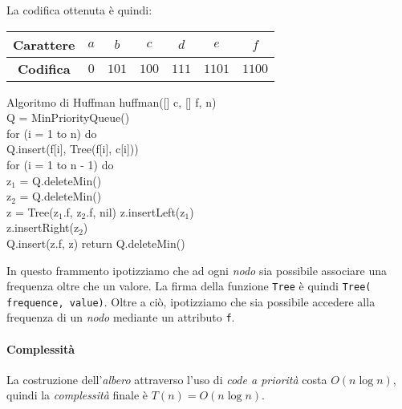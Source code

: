 \noindent
La codifica ottenuta è quindi:
\begin{table}[h!]
    \centering
    \renewcommand{\arraystretch}{1.2}
    \begin{tabular}{|c|c|c|c|c|c|c|}
        \hline
        \textbf{Carattere} & $a$ & $b$ & $c$ & $d$ & $e$ & $f$\\
        \hline
        \textbf{Codifica} & $0$ & $101$ & $100$ & $111$ & $1101$ &  $1100$\\
        \hline
    \end{tabular}
\end{table}

\newpage
\begin{minicode}{Algoritmo di Huffman}
\ind{} huffman([] c, [] f,  n)\\
     Q = MinPriorityQueue()\\
    \indf for (i = 1 to n) do\\
        Q.insert(f[i], Tree(f[i], c[i]))\\
    \indf for (i = 1 to n - 1) do\\
        z$_1$ = Q.deleteMin()\\
        z$_2$ = Q.deleteMin()\\
        z = Tree(z$_1$.f, z$_2$.f, nil)\hfill{}
        z.insertLeft(z$_1$)\\
        z.insertRight(z$_2$)\\
        Q.insert(z.f, z)\hfill{}
    \indf return Q.deleteMin()
\end{minicode}
\begin{note}
    In questo frammento ipotizziamo che ad ogni \emph{nodo} sia possibile
    associare una frequenza oltre che un valore. La firma della funzione
    \texttt{Tree} è quindi \texttt{Tree( frequence,  value)}.
    Oltre a ciò, ipotizziamo che sia possibile accedere alla frequenza di un
    \emph{nodo} mediante un attributo \texttt{f}.
\end{note}

\paragraph{Complessità}
La costruzione dell'\emph{albero} attraverso l'uso di \emph{code a priorità}
costa $O(n\log n)$, quindi la \emph{complessità} finale è $T(n)=O(n\log n)$.


